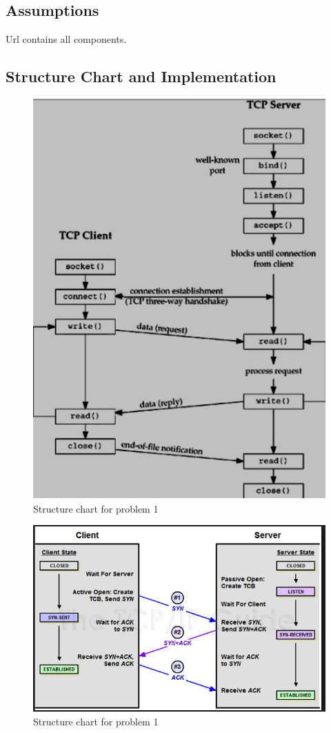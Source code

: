 \documentclass[11pt]{report}
\begin{document}
\subsection{Assumptions}
Url contains all components.
\subsection{Structure Chart and Implementation}
	\begin{figure}[h!]
	\centering
	\includegraphics[scale=0.5]{images/sc11}
	\caption{Structure chart for problem 1}
	\end{figure}		
	\pagebreak
	\begin{figure}[h!]
	\centering
	\includegraphics[scale=0.5]{images/sc12}
	\caption{Structure chart for problem 1}
	\end{figure}		
	\pagebreak
\end{document}
